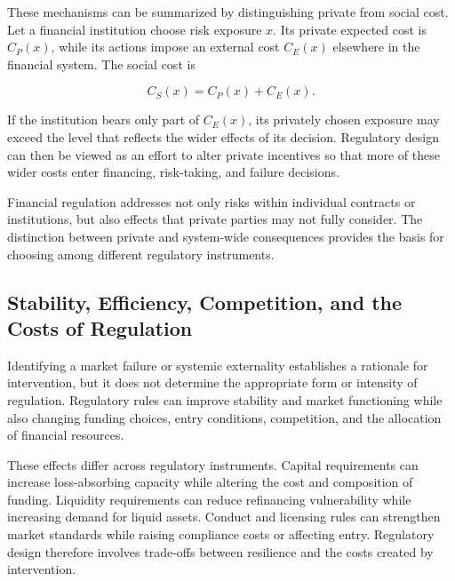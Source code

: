 These mechanisms can be summarized by distinguishing private from social cost. Let a financial institution choose risk exposure \(x\). Its private expected cost is \(C_P(x)\), while its actions impose an external cost \(C_E(x)\) elsewhere in the financial system. The social cost is

\begin{equation}
C_S(x)
=C_P(x)+C_E(x).
\label{eq:ch23-social-cost}
\end{equation}

If the institution bears only part of \(C_E(x)\), its privately chosen exposure may exceed the level that reflects the wider effects of its decision. Regulatory design can then be viewed as an effort to alter private incentives so that more of these wider costs enter financing, risk-taking, and failure decisions.

\begin{tcolorbox}[
enhanced,
breakable,
colback=white,
colframe=FinanceBlue,
boxrule=0.7pt,
sharp corners,
borderline west={2.2pt}{0pt}{FinanceBlue},
title=\textbf{Financial Perspective: Private Decisions Can Have System-Wide Effects},
coltitle=white,
colbacktitle=FinanceBlue,
fonttitle=\bfseries,
before skip=1.2em,
after skip=1.2em
]

Financial regulation addresses not only risks within individual contracts or institutions, but also effects that private parties may not fully consider. The distinction between private and system-wide consequences provides the basis for choosing among different regulatory instruments.

\end{tcolorbox}

\subsection{Stability, Efficiency, Competition, and the Costs of Regulation}

Identifying a market failure or systemic externality establishes a rationale for intervention, but it does not determine the appropriate form or intensity of regulation. Regulatory rules can improve stability and market functioning while also changing funding choices, entry conditions, competition, and the allocation of financial resources.

These effects differ across regulatory instruments. Capital requirements can increase loss-absorbing capacity while altering the cost and composition of funding. Liquidity requirements can reduce refinancing vulnerability while increasing demand for liquid assets. Conduct and licensing rules can strengthen market standards while raising compliance costs or affecting entry. Regulatory design therefore involves trade-offs between resilience and the costs created by intervention.

